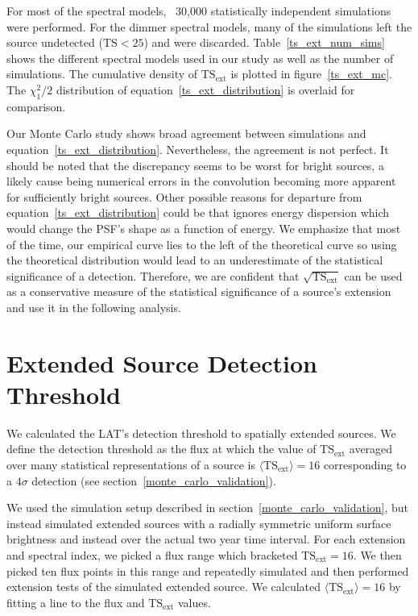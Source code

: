 \documentclass[12pt,preprint]{aastex}
\newcommand{\tsext}{{\ensuremath{\text{TS}_{\text{ext}}}}\xspace}
\newcommand{\ts}{\text{TS}\xspace}
\newcommand{\pointlike}{\text{\em pointlike}\xspace}
\begin{document}
For most of the spectral models, ~30,000 statistically independent
simulations were performed. For the dimmer spectral models, many of the
simulations left the source undetected ($\ts<25$)
and were discarded.  Table~\ref{ts_ext_num_sims}
shows the different spectral models used in our study as well as the
number of simulations.  The cumulative density of \tsext is plotted in
figure~\ref{ts_ext_mc}. The $\chi^2_1/2$ distribution of
equation~\ref{ts_ext_distribution} is overlaid for comparison.

Our Monte Carlo study shows broad agreement between simulations and
equation~\ref{ts_ext_distribution}. Nevertheless, the agreement is not
perfect.  It should be noted that the discrepancy seems to be worst for
bright sources, a likely cause being numerical errors in the convolution
becoming more apparent for sufficiently bright sources.  Other possible
reasons for departure from equation~\ref{ts_ext_distribution} could
be that \pointlike ignores energy dispersion which would change the
PSF's shape as a function of energy. We emphasize that most of the
time, our empirical curve lies to the left of the theoretical curve so
using the theoretical distribution would lead to an underestimate of the
statistical significance of a detection. Therefore, we are confident that
$\sqrt{\tsext}$ can be used as a conservative measure of the statistical
significance of a source's extension and use it in the following analysis.

\section{Extended Source Detection Threshold}\label{extension_sensitivity}

We calculated the LAT's detection threshold to spatially extended
sources. We define the detection threshold as the flux at which the value
of $\tsext$ averaged over many statistical representations of a source
is $\langle\tsext\rangle=16$ corresponding to a $4\sigma$ detection
(see section~\ref{monte_carlo_validation}).

We used the simulation setup described in
section~\ref{monte_carlo_validation}, but instead simulated extended
sources with a radially symmetric uniform surface
brightness and
instead over the actual two year time interval.  For each extension and
spectral index, we picked a flux range which bracketed $\tsext=16$. We
then picked ten flux points in this range and repeatedly simulated
and then performed extension tests of the simulated extended source.
We calculated $\langle\tsext\rangle=16$ by fitting a line to the flux
and $\tsext$ values.
\end{document}

